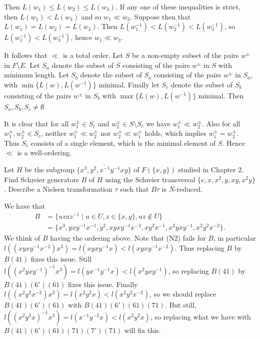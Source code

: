 \begin{questions}
\begin{solution}
    Then $L(w_1)\leq L(w_2)\leq L(w_3)$. If any one of these inequalities is strict, then $L(w_1)<L(w_3)$ and so $w_1\ll w_3$. Suppose then that $L(w_1)=L(w_2)=L(w_3)$. Then $L(w_1^{-1})<L(w_2^{-1})<L(w_3^{-1})$, so $L(w_1^{-1})<L(w_3^{-1})$, hence $w_1\ll w_3$.

    It follows that $\ll$ is a total order. Let $S$ be a non-empty subset of the pairs $w^\pm$ in $F\setminus E$. Let $S_a$ denote the subset of $S$ consisting of the pairs $w^\pm$ in $S$ with minimum length. Let $S_b$ denote the subset of $S_a$ consisting of the pairs $w^\pm$ in $S_a$, with $\min\{L(w),L(w^{-1})\}$ minimal. Finally let $S_c$ denote the subset of $S_b$ consisting of the pairs $w^\pm$ in $S_b$ with $\max\{L(w),L(w^{-1})\}$ minimal. Then $S_a,S_b,S_c\neq\emptyset$.

    It is clear that for all $w_1^\pm\in S_c$ and $w_2^\pm\in S\setminus S_c$ we have $w_1^\pm\ll w_2^\pm$. Also for all $w_1^\pm,w_2^\pm\in S_c$, neither $w_1^\pm\ll w_2^\pm$ nor $w_2^\pm\ll w_1^\pm$ holds, which implies $w_1^\pm=w_2^\pm$. Thus $S_c$ consists of a single element, which is the minimal element of $S$. Hence $\ll$ is a well-ordering.
  \end{solution}

\question Let $H$ be the subgroup $\overline{\{x^3, y^2, x^{-1}y^{-1}xy\}}$ of $F(\{x,y\})$ studied in Chapter 2. Find Schreier generators $B$ of $H$ using the Schreier transversal $\{e,x,x^2,y,xy,x^2y\}$. Describe a Nielsen transformation $\tau$ such that $B\tau$ is $N$-reduced.
  \begin{solution}
    We have that
    \begin{align*}
      B &= \{ uz\overline{uz}^{-1} \mid u\in U, z\in \{x,y\}, uz\notin U \} \\
        &= \{ x^3, yxy^{-1}x^{-1}, y^2, xyxy^{-1}x^{-2}, xy^2x^{-1}, x^2yxy^{-1}, x^2y^2x^{-2} \}.
    \end{align*}
    We think of $B$ having the ordering above. Note that (N2) fails for $B$, in particular $l((xyxy^{-1}x^{-2})x^3)=l(xyxy^{-1}x)<l(xyxy^{-1}x^{-2})$. Thus replacing $B$ by $B(41)$ fixes this issue. Still $l((x^2yxy^{-1})^{-1}x^3)=l(yx^{-1}y^{-1}x)<l(x^2yxy^{-1})$, so replacing $B(41)$ by $B(41)(6')(61)$ fixes this issue. Finally $l((x^2y^2x^{-2})x^3)=l(x^2y^2x)<l(x^2y^2x^{-2})$, so we should replace $B(41)(6')(61)$ with $B(41)(6')(61)(71)$. But still, $l((x^2y^2x)^{-1}x^3)=l(x^{-1}y^{-2}x)<l(x^2y^2x)$, so replacing what we have with $B(41)(6')(61)(71)(7')(71)$ will fix this.


\end{solution}
\end{questions}
